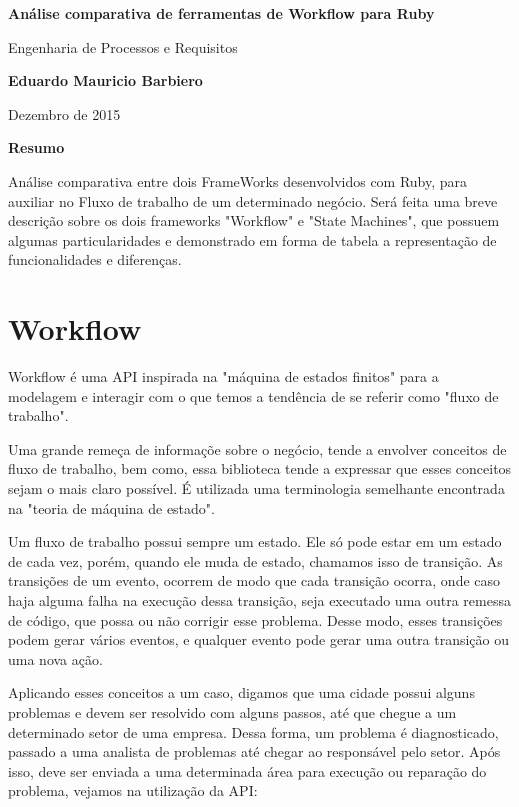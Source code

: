 \documentclass[12pt, letterpaper]{article}
\begin{document}
\begin{center}
    \Large
    \textbf{Análise comparativa de ferramentas de Workflow para Ruby}
    
    \vspace{0.4cm}
    \large
    Engenharia de Processos e Requisitos
    
    \vspace{0.4cm}
    \textbf{Eduardo Mauricio Barbiero}
    
    \vspace{0.4cm}
    {Dezembro de 2015}
    
    \vspace{0.9cm}
    \textbf{Resumo}
\end{center}

\par
Análise comparativa entre dois FrameWorks desenvolvidos com Ruby, para auxiliar no Fluxo de trabalho de um determinado negócio. Será feita uma breve descrição sobre os dois frameworks "Workflow" e "State Machines", que possuem algumas particularidades e demonstrado em forma de tabela a representação de funcionalidades e diferenças. 

\section{Workflow}

Workflow é uma API inspirada na "máquina de estados finitos" para a modelagem e interagir com o que temos a tendência de se referir como "fluxo de trabalho".

Uma grande remeça de informaçõe sobre o negócio, tende a envolver conceitos de fluxo de trabalho, bem como, essa biblioteca tende a expressar que esses conceitos sejam o mais claro possível. É utilizada uma terminologia semelhante encontrada na "teoria de máquina de estado".

Um fluxo de trabalho possui sempre um estado. Ele só pode estar em um estado de cada vez, porém, quando ele muda de estado, chamamos isso de transição. As transições de um evento, ocorrem de modo que cada transição ocorra, onde caso haja alguma falha na execução dessa transição, seja executado uma outra remessa de código, que possa ou não corrigir esse problema. Desse modo, esses transições podem gerar vários eventos, e qualquer evento pode gerar uma outra transição ou uma nova ação.

Aplicando esses conceitos a um caso, digamos que uma cidade possui alguns problemas e devem ser resolvido com alguns passos, até que chegue a um determinado setor de uma empresa. Dessa forma, um problema é diagnosticado, passado a uma analista de problemas até chegar ao responsável pelo setor. Após isso, deve ser enviada a uma determinada área para execução ou reparação do problema, vejamos na utilização da API:
\end{document}
